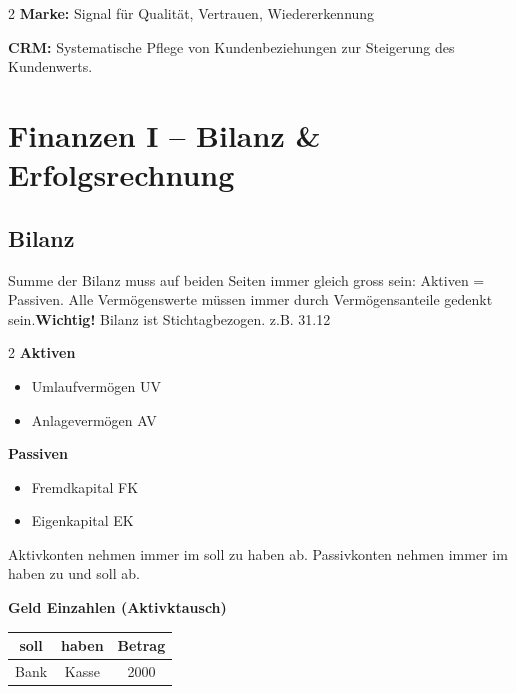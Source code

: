 \documentclass[9pt]{article}
\begin{document}
\begin{multicols}{2}
        \textbf{Marke:} Signal für Qualität, Vertrauen, Wiedererkennung
        
        \textbf{CRM:} Systematische Pflege von Kundenbeziehungen zur Steigerung des Kundenwerts.
        
        
        \section{Finanzen I – Bilanz \& Erfolgsrechnung}
        
        \subsection*{Bilanz}
        
        \begin{center}
        Summe der Bilanz muss auf beiden Seiten immer gleich gross sein: Aktiven = Passiven. Alle Vermögenswerte müssen immer durch Vermögensanteile gedenkt sein.\textbf{Wichtig!} Bilanz ist Stichtagbezogen. z.B. 31.12
        \end{center}
        
        \begin{multicols}{2}
            \textbf{Aktiven}
            \begin{itemize}[noitemsep]
                \item Umlaufvermögen UV
                \item Anlagevermögen AV
            \end{itemize}
            
            \textbf{Passiven}
            \begin{itemize}[noitemsep]
                \item Fremdkapital FK
                \item Eigenkapital EK
            \end{itemize}
        \end{multicols}
        Aktivkonten nehmen immer im soll zu haben ab. Passivkonten nehmen immer im haben zu und soll ab.
        
        \textbf{Geld Einzahlen (Aktivktausch)}
        
        \begin{tabular}{|c|c|c|}
            \hline
            soll & haben & Betrag \\
            \hline
            Bank & Kasse & 2000 \\
            \hline
        \end{tabular}
        

\end{multicols}
\end{document}
